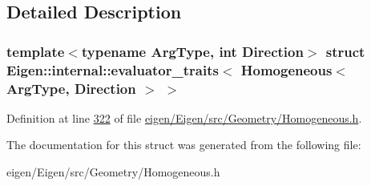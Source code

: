 \subsection{Detailed Description}
\subsubsection*{template$<$typename Arg\+Type, int Direction$>$\newline
struct Eigen\+::internal\+::evaluator\+\_\+traits$<$ Homogeneous$<$ Arg\+Type, Direction $>$ $>$}



Definition at line \hyperlink{eigen_2_eigen_2src_2_geometry_2_homogeneous_8h_source_l00322}{322} of file \hyperlink{eigen_2_eigen_2src_2_geometry_2_homogeneous_8h_source}{eigen/\+Eigen/src/\+Geometry/\+Homogeneous.\+h}.



The documentation for this struct was generated from the following file\+:\begin{DoxyCompactItemize}
\item 
eigen/\+Eigen/src/\+Geometry/\+Homogeneous.\+h\end{DoxyCompactItemize}
